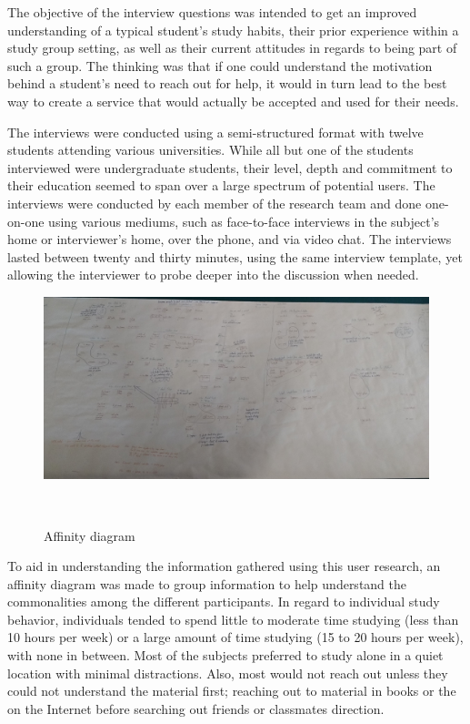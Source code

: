 \documentclass{sigchi-ext}
\begin{document}
The objective of the interview questions was intended to get an improved
understanding of a typical student's study habits, their prior experience
within a study group setting, as well as their current attitudes in regards
to being part of such a group. The thinking was that if one could
understand the motivation behind a student's need to reach out for help, it
would in turn lead to the best way to create a service that would actually
be accepted and used for their needs.

The interviews were conducted using a semi-structured format with twelve
students attending various universities. While all but one of the students
interviewed were undergraduate students, their level, depth and commitment
to their education seemed to span over a large spectrum of potential users.
The interviews were conducted by each member of the research team and done
one-on-one using various mediums, such as face-to-face interviews in the
subject's home or interviewer's home, over the phone, and via video chat.
The interviews lasted between twenty and thirty minutes, using the same
interview template, yet allowing the interviewer to probe deeper into the
discussion when needed.

\begin{figure}
  \includegraphics[width=0.9\columnwidth]{figures/affinity_diagram.jpg}
  \caption{Affinity diagram}~\label{fig:sample}
\end{figure}

To aid in understanding the information gathered using this user research,
an affinity diagram was made to group information to help understand the
commonalities among the different participants. In regard to individual
study behavior, individuals tended to spend little to moderate time
studying (less than 10 hours per week) or a large amount of time studying
(15 to 20 hours per week), with none in between. Most of the subjects
preferred to study alone in a quiet location with minimal distractions.
Also, most would not reach out unless they could not understand the
material first; reaching out to material in books or the on the Internet
before searching out friends or classmates direction.
\end{document}
